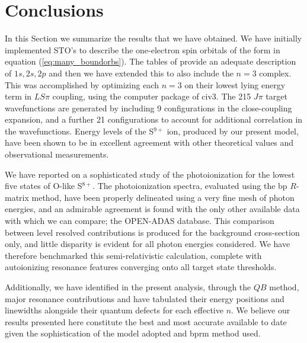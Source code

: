 \section{Conclusions}\label{se:sul_conclusions}
In this Section we summarize the results that we have obtained. We have initially implemented STO's to describe the one-electron spin orbitals of the form in equation (\ref{eq:many_boundorbs}). The tables of \citet{1974ADNDT..14..177C} provide an adequate description of $1s, 2s, 2p$ and then we have extended this to also include the $n = 3$ complex. This was accomplished by optimizing each $n = 3$ on their lowest lying energy term in $LS\pi$ coupling, using the computer package of {\sc civ3}. The 215 $J\pi$ target wavefunctions are generated by including 9 configurations in the close-coupling expansion, and a further 21 configurations to account for additional correlation in the wavefunctions. Energy levels of the S$^{9+}$ ion, produced by our present model, have been shown to be in excellent agreement with other theoretical values and observational measurements.
 
We have reported on a sophisticated study of the photoionization for the lowest five states of O-like S$^{8+}$. The photoionization spectra, evaluated using the {\sc bp} $R$-matrix method, have been properly delineated using a very fine mesh of photon energies, and an admirable agreement is found with the only other available data with which we can compare; the OPEN-ADAS database. This comparison between level resolved contributions is produced for the background cross-section only, and little disparity is evident for all photon energies considered. We have therefore benchmarked this semi-relativistic calculation, complete with autoionizing resonance features converging onto all target state thresholds.

Additionally, we have identified in the present analysis, through the $QB$ method, major resonance contributions and have tabulated their energy positions and linewidths alongside their quantum defects for each effective $n$. We believe our results presented here constitute the best and most accurate available to date given the sophistication of the model adopted and {\sc bprm} method used.



